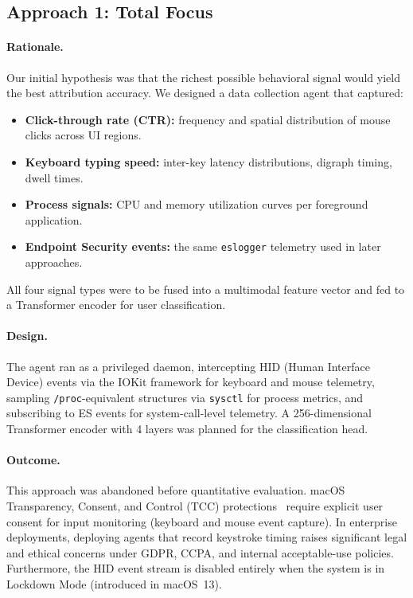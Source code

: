 \documentclass[letterpaper,twocolumn,10pt]{article}
\begin{document}
\subsection{Approach 1: Total Focus}
\label{sec:a1}

\paragraph{Rationale.}
Our initial hypothesis was that the richest possible behavioral
signal would yield the best attribution accuracy.  We designed a
data collection agent that captured:
\begin{itemize}[nosep,leftmargin=*]
\item \textbf{Click-through rate (CTR):} frequency and spatial
  distribution of mouse clicks across UI regions.
\item \textbf{Keyboard typing speed:} inter-key latency
  distributions, digraph timing, dwell times.
\item \textbf{Process signals:} CPU and memory utilization curves
  per foreground application.
\item \textbf{Endpoint Security events:} the same \texttt{eslogger}
  telemetry used in later approaches.
\end{itemize}

All four signal types were to be fused into a multimodal feature
vector and fed to a Transformer encoder for user classification.

\paragraph{Design.}
The agent ran as a privileged daemon, intercepting HID (Human
Interface Device) events via the IOKit framework for keyboard and
mouse telemetry, sampling \texttt{/proc}-equivalent structures via
\texttt{sysctl} for process metrics, and subscribing to ES events
for system-call-level telemetry.  A 256-dimensional Transformer
encoder with 4 layers was planned for the classification head.

\paragraph{Outcome.}
This approach was abandoned before quantitative evaluation.  macOS
Transparency, Consent, and Control (TCC) protections~\cite{apple_es}
require explicit user consent for input monitoring (keyboard and
mouse event capture).  In enterprise deployments, deploying agents
that record keystroke timing raises significant legal and ethical
concerns under GDPR, CCPA, and internal acceptable-use policies.
Furthermore, the HID event stream is disabled entirely when the
system is in Lockdown Mode (introduced in macOS~13).
\end{document}
